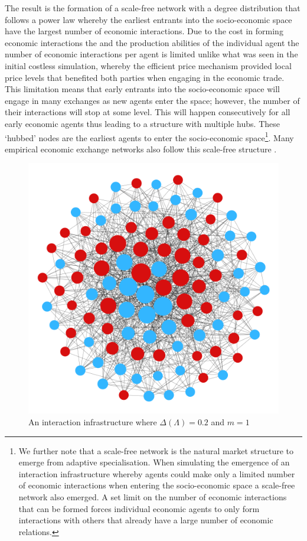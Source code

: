 The result is the formation of a scale-free network with a degree distribution that follows a power law whereby the earliest entrants into the socio-economic space have the largest number of economic interactions. Due to the cost in forming economic interactions the and the production abilities of the individual agent the number of economic interactions per agent is limited unlike what was seen in the initial costless simulation, whereby the efficient price mechanism provided local price levels that benefited both parties when engaging in the economic trade. This limitation means that early entrants into the socio-economic space will engage in many exchanges as new agents enter the space; however, the number of their interactions will stop at some level. This will happen consecutively for all early economic agents thus leading to a structure with multiple hubs. These `hubbed' nodes are the earliest agents to enter the socio-economic space\footnote{We further note that a scale-free network is the natural market structure to emerge from adaptive specialisation. When simulating the emergence of an interaction infrastructure whereby agents could make only a limited number of economic interactions when entering the socio-economic space a scale-free network also emerged. A set limit on the number of economic interactions that can be formed forces individual economic agents to only form interactions with others that already have a large number of economic relations.}. Many empirical economic exchange networks also follow this scale-free structure \citep{Schweitzer2009}.

\begin{figure}[t]
\centering
\includegraphics[scale=0.22]{imgs/Sim3C.png}
\caption{An interaction infrastructure where $\Delta(\Lambda)=0.2$ and $m=1$}
\label{Sim7}
\end{figure}

